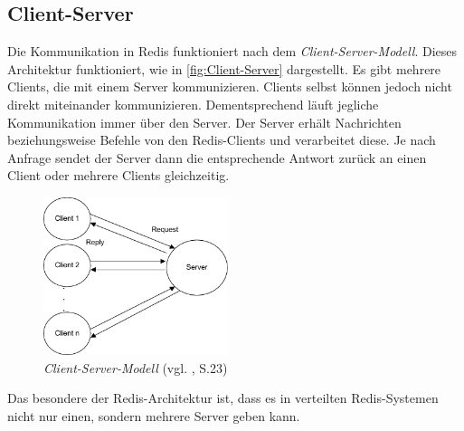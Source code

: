 
\subsection{Client-Server}
\label{sec:Client-Server}
Die Kommunikation in \acs{Redis} funktioniert nach dem \textit{Client-Server-Modell}.
Dieses Architektur funktioniert, wie in \autoref{fig:Client-Server} dargestellt.
Es gibt mehrere Clients, die mit einem Server kommunizieren. 
Clients selbst können jedoch nicht direkt miteinander kommunizieren.
Dementsprechend läuft jegliche Kommunikation immer über den Server.
Der Server erhält Nachrichten beziehungsweise Befehle von den \acs{Redis}-Clients und verarbeitet diese. 
Je nach Anfrage sendet der Server dann die entsprechende Antwort zurück an einen Client oder mehrere Clients gleichzeitig.
\begin{figure}[h]
    \centering
	\includegraphics[width=0.48\textwidth]{images/Client-Server.png}
	\caption{\textit{Client-Server-Modell} (vgl. \cite{Bengel2014}, S.23)}
	\label{fig:Client-Server}
\end{figure}

Das besondere der \acs{Redis}-Architektur ist, dass es in verteilten \acs{Redis}-Systemen nicht nur einen, sondern mehrere Server geben kann.



